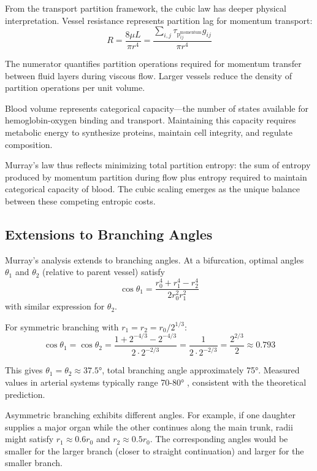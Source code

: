 \documentclass[12pt,a4paper]{article}
\theoremstyle{remark}
\newcommand{\taulag}{\tau_{\mathrm{p}}}
\begin{document}
From the transport partition framework, the cubic law has deeper physical interpretation. Vessel resistance represents partition lag for momentum transport:
\begin{equation}
R = \frac{8\mu L}{\pi r^{4}} = \frac{\sum_{i,j} \taulag_{ij}^{\mathrm{momentum}} g_{ij}}{\pi r^{4}}
\end{equation}

The numerator quantifies partition operations required for momentum transfer between fluid layers during viscous flow. Larger vessels reduce the density of partition operations per unit volume.

Blood volume represents categorical capacity—the number of states available for hemoglobin-oxygen binding and transport. Maintaining this capacity requires metabolic energy to synthesize proteins, maintain cell integrity, and regulate composition.

Murray's law thus reflects minimizing total partition entropy: the sum of entropy produced by momentum partition during flow plus entropy required to maintain categorical capacity of blood. The cubic scaling emerges as the unique balance between these competing entropic costs.

\subsection{Extensions to Branching Angles}

Murray's analysis extends to branching angles. At a bifurcation, optimal angles $\theta_{1}$ and $\theta_{2}$ (relative to parent vessel) satisfy
\begin{equation}
\cos \theta_{1} = \frac{r_{0}^{4} + r_{1}^{4} - r_{2}^{4}}{2r_{0}^{2}r_{1}^{2}}
\end{equation}
with similar expression for $\theta_{2}$.

For symmetric branching with $r_{1} = r_{2} = r_{0}/2^{1/3}$:
\begin{equation}
\cos \theta_{1} = \cos \theta_{2} = \frac{1 + 2^{-4/3} - 2^{-4/3}}{2 \cdot 2^{-2/3}} = \frac{1}{2 \cdot 2^{-2/3}} = \frac{2^{2/3}}{2} \approx 0.793
\end{equation}

This gives $\theta_{1} = \theta_{2} \approx 37.5°$, total branching angle approximately 75°. Measured values in arterial systems typically range 70-80° \cite{zamir1976optimality}, consistent with the theoretical prediction.

Asymmetric branching exhibits different angles. For example, if one daughter supplies a major organ while the other continues along the main trunk, radii might satisfy $r_{1} \approx 0.6r_{0}$ and $r_{2} \approx 0.5r_{0}$. The corresponding angles would be smaller for the larger branch (closer to straight continuation) and larger for the smaller branch.
\end{document}
